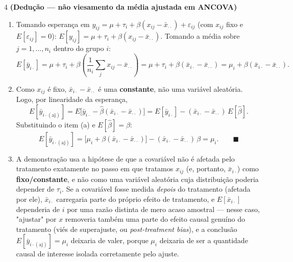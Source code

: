 \documentclass[11pt]{article}
\begin{document}
\begin{questao}{4} \textbf{(Dedução --- não viesamento da média ajustada em ANCOVA)}
\end{questao}
\begin{solucao}
\begin{enumerate}[label=(\alph*)]
  \item Tomando esperança em $y_{ij}=\mu+\tau_i+\beta(x_{ij}-\bar x_{\cdot\cdot})+\varepsilon_{ij}$
    (com $x_{ij}$ fixo e $E[\varepsilon_{ij}]=0$): $E[y_{ij}] = \mu+\tau_i+\beta(x_{ij}-\bar
    x_{\cdot\cdot})$. Tomando a média sobre $j=1,\ldots,n_i$ dentro do grupo $i$:
    \[
    E[\bar y_{i\cdot}] = \mu+\tau_i+\beta\left(\frac{1}{n_i}\sum_j x_{ij} - \bar
    x_{\cdot\cdot}\right) = \mu+\tau_i+\beta(\bar x_{i\cdot}-\bar x_{\cdot\cdot}) =
    \mu_i+\beta(\bar x_{i\cdot}-\bar x_{\cdot\cdot}).
    \]
  \item Como $x_{ij}$ é fixo, $\bar x_{i\cdot}-\bar x_{\cdot\cdot}$ é uma \textbf{constante}, não
    uma variável aleatória. Logo, por linearidade da esperança,
    \[
    E[\bar y_{i\cdot(\text{aj})}] = E\big[\bar y_{i\cdot} - \hat\beta(\bar x_{i\cdot}-\bar
    x_{\cdot\cdot})\big] = E[\bar y_{i\cdot}] - (\bar x_{i\cdot}-\bar x_{\cdot\cdot})\,E[\hat\beta].
    \]
    Substituindo o item (a) e $E[\hat\beta]=\beta$:
    \[
    E[\bar y_{i\cdot(\text{aj})}] = \big[\mu_i+\beta(\bar x_{i\cdot}-\bar x_{\cdot\cdot})\big] -
    (\bar x_{i\cdot}-\bar x_{\cdot\cdot})\,\beta = \mu_i. \qquad \blacksquare
    \]
  \item A demonstração usa a hipótese de que a covariável não é afetada pelo tratamento
    exatamente no passo em que tratamos $x_{ij}$ (e, portanto, $\bar x_{i\cdot}$) como
    \textbf{fixo/constante}, e não como uma variável aleatória cuja distribuição poderia depender
    de $\tau_i$. Se a covariável fosse medida \emph{depois} do tratamento (afetada por ele),
    $\bar x_{i\cdot}$ carregaria parte do próprio efeito de tratamento, e $E[\bar x_{i\cdot}]$
    dependeria de $i$ por uma razão distinta de mero acaso amostral --- nesse caso, "ajustar" por
    $x$ removeria também uma parte do efeito causal genuíno do tratamento (viés de
    superajuste, ou \emph{post-treatment bias}), e a conclusão $E[\bar y_{i\cdot(\text{aj})}] =
    \mu_i$ deixaria de valer, porque $\mu_i$ deixaria de ser a quantidade causal de interesse
    isolada corretamente pelo ajuste.
\end{enumerate}
\end{solucao}
\end{document}
